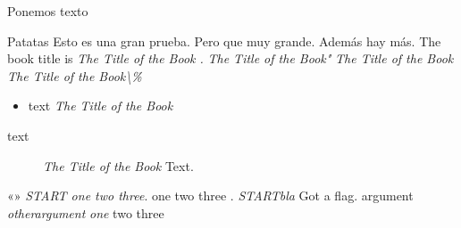 Ponemos texto

\salto



\lulu

Patatas
Esto es una gran prueba. Pero que muy grande. Además
hay más.
The book title is
\emph{The Title of the Book .}
\emph{The Title of the Book"}
\emph{The Title of the Book}
\emph{The Title of the Book\textbackslash{}\%}
\begin{itemize}
\item text
\emph{The Title of the Book}
\end{itemize}
\begin{description}
\item[text] \emph{The Title of the Book}
Text.
\end{description}
«»
\emph{START one two three}.
one two three .
\emph{START}\emph{bla}
Got a flag.
argument
\emph{otherargument}
\emph{one}
two three

